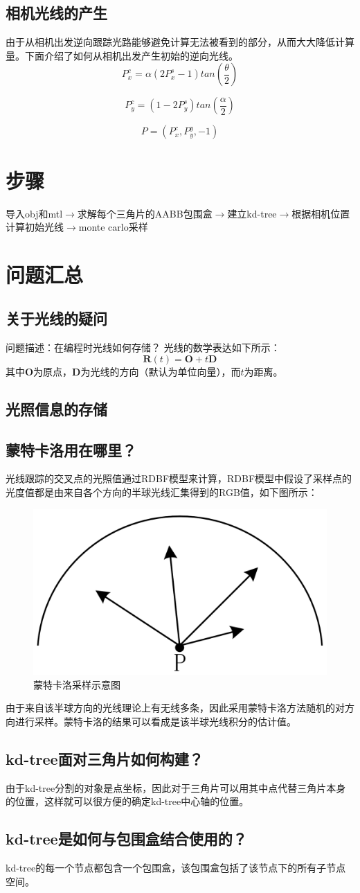\documentclass[10pt]{article}
\begin{document}
\subsection{相机光线的产生}
由于从相机出发逆向跟踪光路能够避免计算无法被看到的部分，从而大大降低计算量。下面介绍了如何从相机出发产生初始的逆向光线。
$$P_x^{c}=\alpha(2P_x^{s}-1) tan(\frac{\theta}{2})$$

$$P_y^{c}=(1-2P_y^{s})tan(\frac{\alpha}{2})$$

$$P=(P_x^{c},P_y^{y},-1)$$
\section{步骤}
导入obj和mtl$\to$求解每个三角片的AABB包围盒$\to$建立kd-tree$\to$根据相机位置计算初始光线$\to$monte carlo采样

\section{问题汇总}
\subsection{关于光线的疑问}
问题描述：在编程时光线如何存储？
光线的数学表达如下所示：
$$\bm{R}(t)=\bm{O}+t\bm{D}$$
其中$\bm{O}$为原点，$\bm{D}$为光线的方向（默认为单位向量），而$t$为距离。
\subsection{光照信息的存储}

\subsection{蒙特卡洛用在哪里？}
光线跟踪的交叉点的光照值通过RDBF模型来计算，RDBF模型中假设了采样点的光度值都是由来自各个方向的半球光线汇集得到的RGB值，如下图所示：
\begin{figure}[H]
\begin{center}
\includegraphics[scale=0.25]{monte_carlo_sample.png}
\caption{蒙特卡洛采样示意图}
\end{center}
\end{figure}
由于来自该半球方向的光线理论上有无线多条，因此采用蒙特卡洛方法随机的对方向进行采样。蒙特卡洛的结果可以看成是该半球光线积分的估计值。
\subsection{kd-tree面对三角片如何构建？}
由于kd-tree分割的对象是点坐标，因此对于三角片可以用其中点代替三角片本身的位置，这样就可以很方便的确定kd-tree中心轴的位置。
\subsection{kd-tree是如何与包围盒结合使用的？}
kd-tree的每一个节点都包含一个包围盒，该包围盒包括了该节点下的所有子节点空间。
\end{document}
